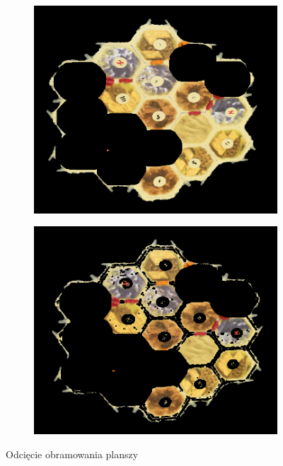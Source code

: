 \documentclass[a4paper]{article}
\begin{document}
	\begin{figure}[h]
        \begin{subfigure}[]{.5\linewidth}
        \includegraphics[width=\linewidth]{pictures/fields/pre_cut.png}

        \end{subfigure}
        \begin{subfigure}[]{0.5\linewidth}
        \includegraphics[width=\linewidth]{pictures/fields/after_cut.png}
        \end{subfigure}

        \caption{Odcięcie obramowania planszy}
        \label{fig:step5}
    \end{figure}
	
\end{document}
